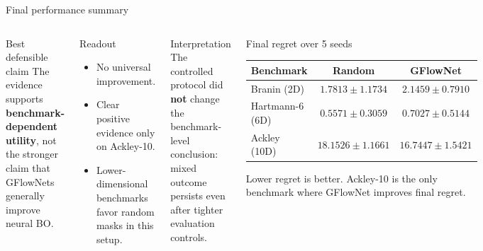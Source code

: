 \documentclass[aspectratio=169]{beamer}
\newcommand{\TinyCap}{\fontsize{7.6}{8.6}\selectfont}
\begin{document}
\begin{frame}{Final performance summary}
\vspace{-0.55em}
\begin{columns}[T,onlytextwidth]
\begin{minipage}[t][0.80\textheight]{\linewidth}\vspace{0pt}
  \begin{cardA}{Best defensible claim}
  The evidence supports \textbf{benchmark-dependent utility}, not the stronger claim that GFlowNets generally improve neural BO.
  \end{cardA}

  \vfill

  \begin{cardG}{Readout}
  \begin{itemize}
    \item No universal improvement.
    \item Clear positive evidence only on Ackley-10.
    \item Lower-dimensional benchmarks favor random masks in this setup.
  \end{itemize}
  \end{cardG}

  \vfill

  \begin{cardW}{Interpretation}
  The controlled protocol did \textbf{not} change the benchmark-level conclusion: mixed outcome persists even after tighter evaluation controls.
  \end{cardW}
\end{minipage}

\begin{minipage}[t][0.80\textheight]{\linewidth}\vspace{0pt}
  \begin{card}{Final regret over 5 seeds}
  \centering
  \scriptsize
  \begin{tabular}{lcc}
  \toprule
  Benchmark & Random & GFlowNet \\
  \midrule
  Branin (2D) & $1.7813 \pm 1.1734$ & $2.1459 \pm 0.7910$ \\
  Hartmann-6 (6D) & $0.5571 \pm 0.3059$ & $0.7027 \pm 0.5144$ \\
  Ackley (10D) & $18.1526 \pm 1.1661$ & $16.7447 \pm 1.5421$ \\
  \bottomrule
  \end{tabular}

  \vspace{0.45em}
  {\TinyCap Lower regret is better. Ackley-10 is the only benchmark where GFlowNet improves final regret.}
  \end{card}
\end{minipage}
\end{columns}
\end{frame}
\end{document}
